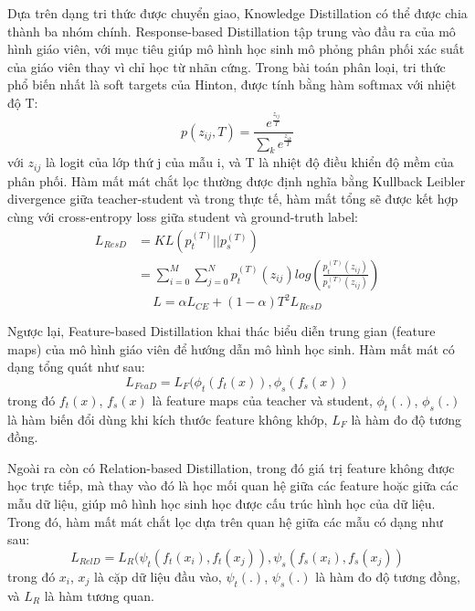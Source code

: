 Dựa trên dạng tri thức được chuyển giao, Knowledge Distillation có thể được chia thành ba nhóm chính. Response-based Distillation tập trung vào đầu ra của mô hình giáo viên, với mục tiêu giúp mô hình học sinh mô phỏng phân phối xác suất của giáo viên thay vì chỉ học từ nhãn cứng. Trong bài toán phân loại, tri thức phổ biến nhất là soft targets của Hinton\cite{46_Hinton2015DistillingTK}, được tính bằng hàm softmax với nhiệt độ T:
    \begin{equation}
        p(z_{ij},T) = \frac{e^{\frac{z_{ij}}{T}}}{\sum_ke^{\frac{z_{ik}}{T}}}
    \end{equation}
với $z_{ij}$ là logit của lớp thứ j của mẫu i, và T là nhiệt độ điều khiển độ mềm của phân phối. Hàm mất mát chắt lọc thường được định nghĩa bằng Kullback Leibler divergence giữa teacher-student và trong thực tế, hàm mất tổng sẽ được kết hợp cùng với cross-entropy loss giữa student và ground-truth label: 
     \begin{equation}
     \begin{aligned}
          L_{ResD} &= KL(p_t^{(T)}||p_s^{(T)})\\
          &= \sum\limits_{i=0}^M\sum\limits_{j=0}^Np_t^{(T)}(z_{ij})log\left(\frac{p_t^{(T)}(z_{ij})}{p_s^{(T)}(z_{ij})}\right)
     \end{aligned}
     \end{equation}
     \begin{equation}
         L = \alpha L_{CE} + (1-\alpha)T^2L_{ResD}
     \end{equation}

Ngược lại, Feature-based Distillation khai thác biểu diễn trung gian (feature maps) của mô hình giáo viên để hướng dẫn mô hình học sinh. Hàm mất mát có dạng tổng quát như sau: 
    \begin{equation}
        L_{FeaD} = L_F(\phi_t(f_t(x)),\phi_s(f_s(x))
    \end{equation}
trong đó $f_t(x)$, $f_s(x)$ là feature maps của teacher và student, $\phi_t(.)$, $\phi_s(.)$ là hàm biến đổi dùng khi kích thước feature không khớp, $L_F$ là hàm đo độ tương đồng. 

Ngoài ra còn có Relation-based Distillation, trong đó giá trị feature không được học trực tiếp, mà thay vào đó là học mối quan hệ giữa các feature hoặc giữa các mẫu dữ liệu, giúp mô hình học sinh học được cấu trúc hình học của dữ liệu. Trong đó, hàm mất mát chắt lọc dựa trên quan hệ giữa các mẫu có dạng như sau:
        \begin{equation}
            L_{RelD} = L_R(\psi_t(f_t(x_i),f_t(x_j)),\psi_s(f_s(x_i),f_s(x_j))
        \end{equation}
trong đó $x_i$, $x_j$ là cặp dữ liệu đầu vào, $\psi_t(.)$, $\psi_s(.)$ là hàm đo độ tương đồng, và $L_R$ là hàm tương quan. 

